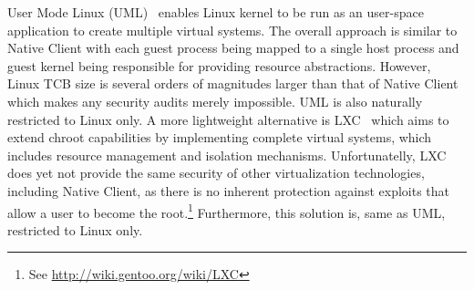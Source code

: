 User Mode Linux (UML)~\cite{dike:uml06} enables Linux kernel to be run as
an user-space application to create multiple virtual systems. The
overall approach is similar to Native Client with each guest process being
mapped to a single host process and guest kernel being responsible for
providing resource abstractions. However, Linux TCB size is several
orders of magnitudes larger than that of Native Client which makes any
security audits merely impossible. UML is also naturally restricted to
Linux only. A more lightweight alternative is LXC~\cite{lxc} which aims
to extend chroot capabilities by implementing complete virtual systems,
which includes resource management and isolation mechanisms.
Unfortunatelly, LXC does yet not provide the same security of other
virtualization technologies, including Native Client, as there is no
inherent protection against exploits that allow a user to become the
root.\footnote{See \url{http://wiki.gentoo.org/wiki/LXC}} Furthermore,
this solution is, same as UML, restricted to Linux only. 


